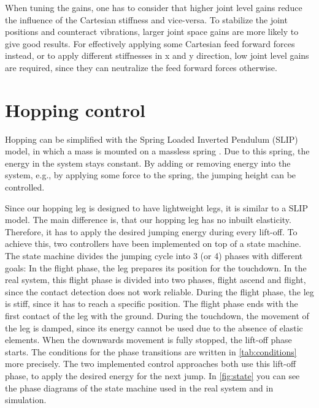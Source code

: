 \documentclass[onecolumn, letter paper]{report}
\begin{document}
When tuning the gains, one has to consider that higher joint level gains reduce the influence of the Cartesian stiffness and vice-versa. To stabilize the joint positions and counteract vibrations, larger joint space gains are more likely to give good results. For effectively applying some Cartesian feed forward forces instead, or to apply different stiffnesses in x and y direction, low joint level gains are required, since they can neutralize the feed forward forces otherwise. 






\chapter{Hopping control}
Hopping can be simplified with the Spring Loaded Inverted Pendulum (SLIP) model, in which a mass is mounted on a massless spring \cite{Tedrake}. Due to this spring, the energy in the system stays constant. By adding or removing energy into the system, e.g., by applying some force to the spring, the jumping height can be controlled.

Since our hopping leg is designed to have lightweight legs, it is similar to a SLIP model. The main difference is, that our hopping leg has no inbuilt elasticity. Therefore, it has to apply the desired jumping energy during every lift-off. To achieve this, two controllers have been implemented on top of a state machine. The state machine divides the jumping cycle into 3 (or 4) phases with different goals:  In the flight phase, the leg prepares its position for the touchdown. In the real system, this flight phase is divided into two phases, flight ascend and flight, since the contact detection does not work reliable. During the flight phase, the leg is stiff, since it has to reach a specific position. The flight phase ends with the first contact of the  leg with the ground. During the touchdown, the movement of the leg is damped, since its energy cannot be used due to the absence of elastic elements. When the downwards movement is fully stopped, the lift-off phase starts. The conditions for the phase transitions are written in \autoref{tab:conditions} more precisely.
The two implemented control approaches both use this lift-off phase, to apply the desired energy for the next jump. In \autoref{fig:state} you can see the phase diagrams of the state machine used in the real system and in simulation.
\end{document}
